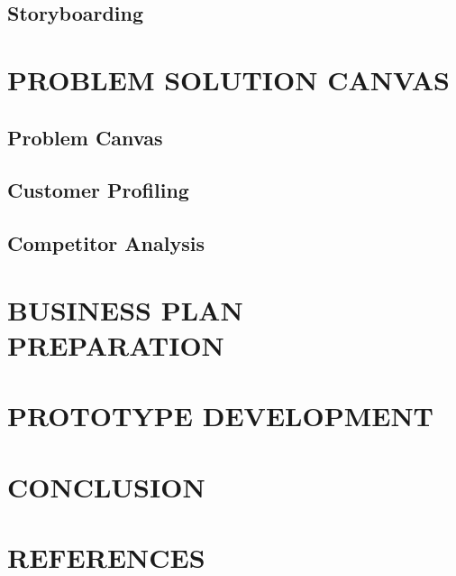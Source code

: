 \documentclass[a4paper,12pt]{report}
\begin{document}
\section{Storyboarding}

\chapter{PROBLEM SOLUTION CANVAS}
\section{Problem Canvas}
\section{Customer Profiling}
\section{Competitor Analysis}

\chapter{BUSINESS PLAN PREPARATION}

\chapter{PROTOTYPE DEVELOPMENT}

\chapter{CONCLUSION}

\chapter{REFERENCES}
\end{document}
